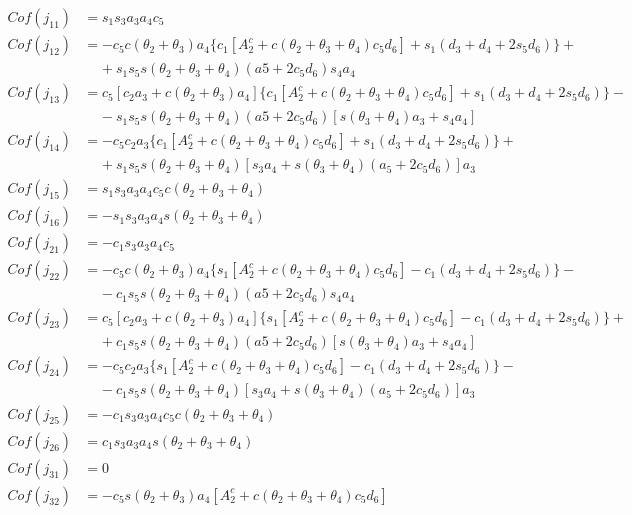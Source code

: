 \begin{align*}
    Cof(j_{11}) &= s_1s_3a_3a_4c_5 \\    
    Cof(j_{12}) &= -c_5c(\theta_2+\theta_3)a_4\{c_1[A_2^c+c(\theta_2+\theta_3+\theta_4)c_5d_6]+s_1(d_3+d_4+2s_5d_6)\}+ \\
                   & \;\;\;\; +\!s_1s_5s(\theta_2+\theta_3+\theta_4)(a5+2c_5d_6)s_4a_4 \\
    Cof(j_{13}) &= c_5[c_2a_3+c(\theta_2+\theta_3)a_4]\{c_1[A_2^c+c(\theta_2+\theta_3+\theta_4)c_5d_6]+s_1(d_3+d_4+2s_5d_6)\}- \\
                   & \;\;\;\; -s_1s_5s(\theta_2+\theta_3+\theta_4)(a5+2c_5d_6)[s(\theta_3+\theta_4)a_3+s_4a_4] \\
    Cof(j_{14}) &= -c_5c_2a_3\{c_1[A_2^c+c(\theta_2+\theta_3+\theta_4)c_5d_6]+s_1(d_3+d_4+2s_5d_6)\}+ \\
                   & \;\;\;\; +\!s_1s_5s(\theta_2+\theta_3+\theta_4)[s_3a_4+s(\theta_3+\theta_4)(a_5+2c_5d_6)]a_3 \\
    Cof(j_{15}) &= s_1s_3a_3a_4c_5c(\theta_2+\theta_3+\theta_4) \\ 
    Cof(j_{16}) &= -s_1s_3a_3a_4s(\theta_2+\theta_3+\theta_4) \\
    Cof(j_{21}) &= -c_1s_3a_3a_4c_5 \\    
    Cof(j_{22}) &= -c_5c(\theta_2+\theta_3)a_4\{s_1[A_2^c+c(\theta_2+\theta_3+\theta_4)c_5d_6]-c_1(d_3+d_4+2s_5d_6)\}- \\
                   & \;\;\;\; -\!c_1s_5s(\theta_2+\theta_3+\theta_4)(a5+2c_5d_6)s_4a_4 \\
    Cof(j_{23}) &= c_5[c_2a_3+c(\theta_2+\theta_3)a_4]\{s_1[A_2^c+c(\theta_2+\theta_3+\theta_4)c_5d_6]-c_1(d_3+d_4+2s_5d_6)\}+ \\
                   & \;\;\;\; +c_1s_5s(\theta_2+\theta_3+\theta_4)(a5+2c_5d_6)[s(\theta_3+\theta_4)a_3+s_4a_4] \\
    Cof(j_{24}) &= -c_5c_2a_3\{s_1[A_2^c+c(\theta_2+\theta_3+\theta_4)c_5d_6]-c_1(d_3+d_4+2s_5d_6)\}- \\
                   & \;\;\;\; -\!c_1s_5s(\theta_2+\theta_3+\theta_4)[s_3a_4+s(\theta_3+\theta_4)(a_5+2c_5d_6)]a_3 \\
    Cof(j_{25}) &= -c_1s_3a_3a_4c_5c(\theta_2+\theta_3+\theta_4) \\ 
    Cof(j_{26}) &= c_1s_3a_3a_4s(\theta_2+\theta_3+\theta_4) \\  
    Cof(j_{31}) &= 0 \\   
    Cof(j_{32}) &= -c_5s(\theta_2+\theta_3)a_4[A_2^c+c(\theta_2+\theta_3+\theta_4)c_5d_6] \\

\end{align*}
